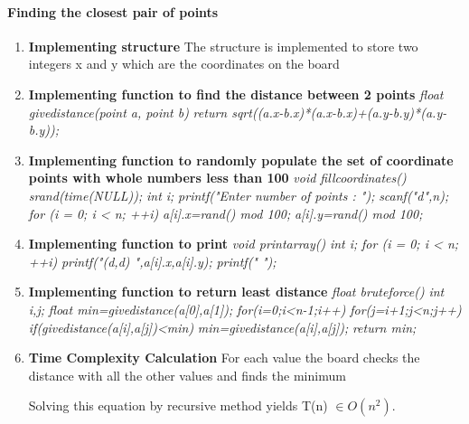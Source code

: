 \documentclass[a4paper,11pt]{article}
\begin{document}
\paragraph{Finding the closest pair of points}
\begin{enumerate}
\item \textbf{Implementing structure}
The structure is implemented to store two integers x and y which are the coordinates on the board

 \item \textbf{Implementing function to find the distance between 2 points}
 \newline
\emph{	float givedistance(point a, point b)} \newline
\emph{  return sqrt((a.x-b.x)*(a.x-b.x)+(a.y-b.y)*(a.y-b.y));}

\item \textbf{Implementing function to randomly populate the set of coordinate points with whole numbers less than 100}
\newline \emph{ void fillcoordinates() }
 \newline \emph{   srand(time(NULL)); }
 \newline \emph{   int i; }
 \newline \emph{   printf("Enter number of points : "); }
 \newline \emph{   scanf("d",n); }
 \newline \emph{   for (i = 0; i < n; ++i) }
 \newline \emph{       a[i].x=rand() mod 100; }
 \newline \emph{       a[i].y=rand() mod 100; }

 \item \textbf{Implementing function to print}
\newline \emph{ void printarray() }
 \newline \emph{   int i; }
 \newline \emph{   for (i = 0; i < n; ++i) }
 \newline \emph{       printf("(d,d) ",a[i].x,a[i].y); }
 \newline \emph{   printf(" "); }

\item \textbf{Implementing function to return least distance}
\newline \emph{float bruteforce()}
 \newline \emph{   int i,j;}
\newline \emph{    float min=givedistance(a[0],a[1]);}
\newline \emph{    for(i=0;i<n-1;i++)}
 \newline \emph{       for(j=i+1;j<n;j++)}
  \newline \emph{          if(givedistance(a[i],a[j])<min)}
 \newline \emph{               min=givedistance(a[i],a[j]);}
 \newline \emph{   return min; }

\item \textbf{Time Complexity Calculation}
For each value the board checks the distance with all the other values and finds the minimum

Solving this equation by recursive method yields T(n) $\in O(n^2)$.

\end{enumerate}
\end{document}
